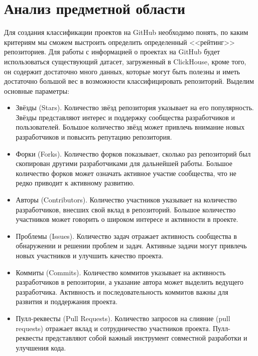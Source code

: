 \newpage
\section{Анализ предметной области}
\label{sec:Definition}

 Для создания классификации проектов на GitHub необходимо понять, по каким критериям мы сможем выстроить определить определенный <<рейтинг>> репозиториев. Для работы с информацией о проектах на GitHub будет использоваться существующий датасет, загруженный в ClickHouse, кроме того, он содержит достаточно много данных, которые могут быть полезны и иметь достаточно большой вес в возможности классифицировать репозиторий. Выделим основные параметры:
 \begin{itemize}
     \item Звёзды (Stars). Количество звёзд  репозитория указывает на его популярность. Звёзды представляют интерес и поддержку сообщества разработчиков и пользователей. Большое количество звёзд может привлечь внимание новых разработчиков и повысить репутацию репозитория.
     \item Форки (Forks). Количество форков показывает, сколько раз репозиторий был скопирован другими разработчиками для дальнейшей работы. Большое количество форков может означать активное участие сообщества, что не редко приводит к активному развитию.
    \item Авторы (Contributors). Количество участников указывает на количество разработчиков, внесших свой вклад в репозиторий. Большое количество участников может говорить о широком интересе и активности в проекте.
    \item Проблемы (Issues). Количество задач отражает активность сообщества в обнаружении и решении проблем и задач. Активные задачи могут привлечь новых участников и улучшить качество проекта.
    \item Коммиты (Commits). Количество коммитов указывает на активность разработчиков в репозитории, а указание автора может выделить ведущего разработчика. Активность и последовательность коммитов важны для развития и поддержания проекта.
    \item Пулл-реквесты (Pull Requests). Количество запросов на слияние (pull requests) отражает вклад и сотрудничество участников проекта. Пулл-реквесты представляют собой важный инструмент совместной разработки и улучшения кода.
 \end{itemize}